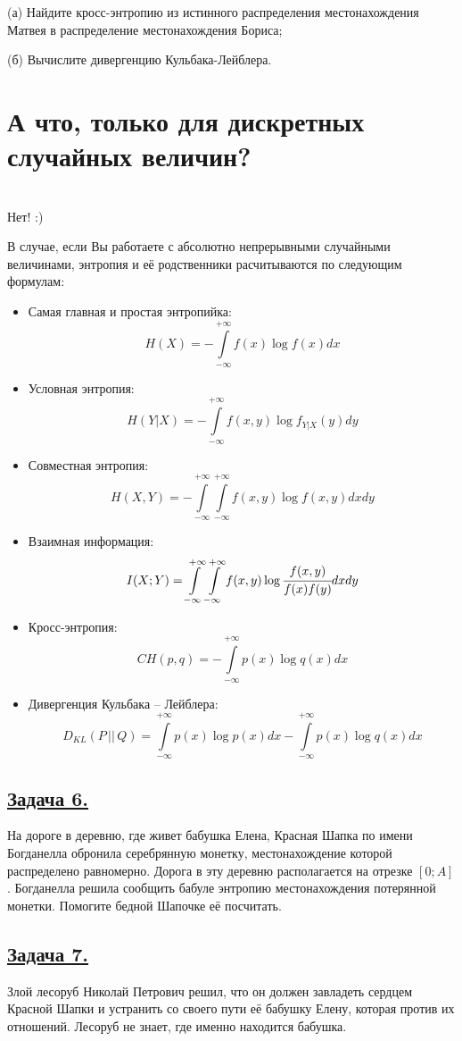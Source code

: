 (а) Найдите кросс-энтропию из истинного распределения местонахождения Матвея в распределение местонахождения Бориса;

(б) Вычислите дивергенцию Кульбака-Лейблера.

\section*{А что, только для дискретных случайных величин?}~\
\\

Нет! :)

В случае, если Вы работаете с абсолютно непрерывными случайными величинами, энтропия и её родственники расчитываются по следующим формулам:
\begin{itemize}
    \item Самая главная и простая энтропийка:
    \[H(X)=-\int\limits_{-\infty}^{+\infty} f(x)\log f(x)dx \]
    \item Условная энтропия:
    \[H(Y|X)=-\int\limits_{-\infty}^{+\infty} f(x, y)\log f_{Y|X}(y)dy \]
    \item Совместная энтропия:
    \[H(X, Y)=-\int\limits_{-\infty}^{+\infty} \int\limits_{-\infty}^{+\infty} f(x, y)\log f(x, y)dxdy \]
    \item Взаимная информация:
    \[I(X; Y)=\int\limits_{-\infty}^{+\infty} \int\limits_{-\infty}^{+\infty} f(x, y) \log \cfrac{f(x, y)}{f(x)f(y)}dxdy \]
    \item Кросс-энтропия:
    \[CH(p, q)=-\int\limits_{-\infty}^{+\infty}p(x)\log q(x) dx \]
    \item Дивергенция Кульбака -- Лейблера:
    \[D_{KL}(P\, ||\, Q)=\int\limits_{-\infty}^{+\infty} p(x)\log p(x)dx -\int\limits_{-\infty}^{+\infty} p(x)\log q(x)dx  \]
\end{itemize}

\subsection*{\hyperref[sec:sol_problem6]{Задача 6.}}\label{sec:problem6} На дороге в деревню, где живет бабушка Елена, Красная Шапка по имени Богданелла обронила серебрянную монетку, местонахождение которой распределено равномерно. Дорога в эту деревню располагается на отрезке $[0; A]$. Богданелла решила сообщить бабуле энтропию местонахождения потерянной монетки. Помогите бедной Шапочке её посчитать.

\subsection*{\hyperref[sec:sol_problem7]{Задача 7.}}\label{sec:problem7} Злой лесоруб Николай Петрович решил, что он должен завладеть сердцем Красной Шапки и устранить со своего пути её бабушку Елену, которая против их отношений. Лесоруб не знает, где именно находится бабушка.

